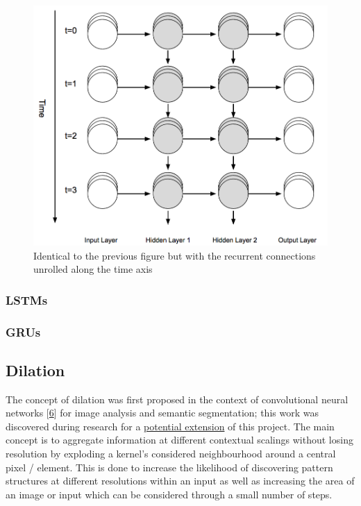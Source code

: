 \documentclass[12pt,]{article}
\begin{document}
\begin{figure}
\centering
\includegraphics{Images/rnnunrolled.png}
\caption{Identical to the previous figure but with the recurrent
connections unrolled along the time axis}
\end{figure}

\hypertarget{lstms}{%
\subsubsection{LSTMs}\label{lstms}}

\hypertarget{grus}{%
\subsubsection{GRUs}\label{grus}}

\hypertarget{dilation}{%
\subsection{Dilation}\label{dilation}}

The concept of dilation was first proposed in the context of
convolutional neural networks
{[}\protect\hyperlink{ref-yu2015multi}{6}{]} for image analysis and
semantic segmentation; this work was discovered during research for a
\protect\hyperlink{sentimentfromimages}{potential extension} of this
project. The main concept is to aggregate information at different
contextual scalings without losing resolution by exploding a kernel's
considered neighbourhood around a central pixel / element. This is done
to increase the likelihood of discovering pattern structures at
different resolutions within an input as well as increasing the area of
an image or input which can be considered through a small number of
steps.
\end{document}
